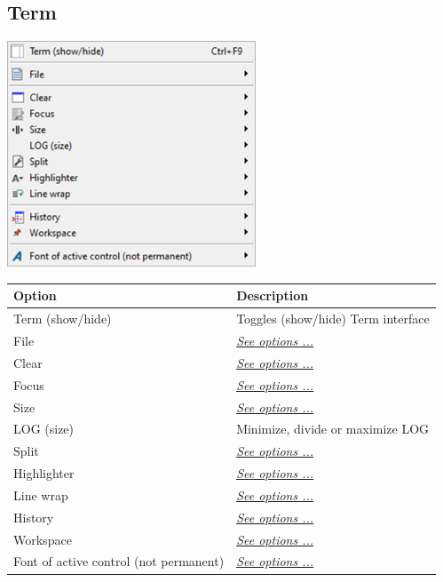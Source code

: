 \hypertarget{menu_r_term}{}
\subsection{Term}

\includegraphics[scale=0.8]{./res/menu_r_term.png} \\

\begin{scriptsize}
  \begin{tabularx}{\textwidth}{>{\hsize=0.7\hsize}X>{\hsize=0.7\hsize}X}\\
    \hline
    \textbf{Option} & \textbf{Description} \\
    \hline
    Term (show/hide) & Toggles (show/hide) Term interface \\
    \hdashline[1pt/1pt]
    File & \textit{\href{\#menu\_r\_term\_file}{See options ...}} \\
    \hdashline[1pt/1pt]
    Clear & \textit{\href{\#menu\_r\_term\_clear}{See options ...}} \\
    Focus & \textit{\href{\#menu\_r\_term\_focus}{See options ...}} \\
    Size & \textit{\href{\#menu\_r\_term\_size}{See options ...}} \\
    LOG (size) &  Minimize, divide or maximize LOG \\
    Split & \textit{\href{\#menu\_r\_term\_split}{See options ...}} \\
    Highlighter & \textit{\href{\#menu\_r\_term\_highlighter}{See options ...}} \\
    Line wrap & \textit{\href{\#menu\_r\_term\_linewrap}{See options ...}} \\
    \hdashline[1pt/1pt]
    History & \textit{\href{\#menu\_r\_term\_history}{See options ...}} \\
    Workspace & \textit{\href{\#menu\_r\_term\_workspace}{See options ...}} \\
    \hdashline[1pt/1pt]
    Font of active control (not permanent) & \textit{\href{\#menu\_r\_term\_fontsize}{See options ...}} \\
    \hline
  \end{tabularx}
\end{scriptsize}

